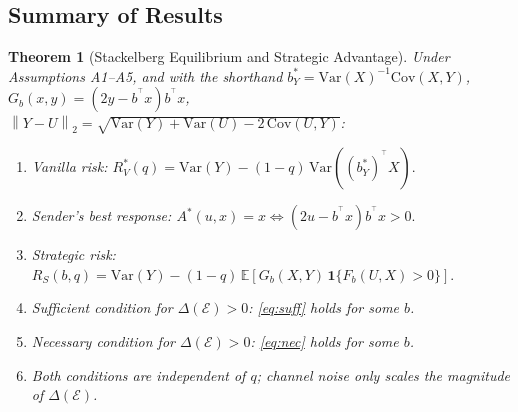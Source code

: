 \documentclass[11pt]{article}
\newtheorem{theorem}{Theorem}[section]
\theoremstyle{definition}
\theoremstyle{remark}
\newcommand{\E}{\mathbb{E}}
\newcommand{\norm}[1]{\left\lVert#1\right\rVert}
\newcommand{\T}{^{\top}}
\begin{document}
\subsection{Summary of Results}

\begin{theorem}[Stackelberg Equilibrium and Strategic Advantage]\label{thm:main}
  Under Assumptions A1--A5, and with the shorthand
  $b_{Y}^{*}=\mathrm{Var}(X)^{-1}\mathrm{Cov}(X,Y)$,
  $G_{b}(x,y)=(2y-b^{\T}x)b^{\T}x$, $\norm{Y-U}_{2}=\sqrt{\mathrm{Var}(Y)+\mathrm{Var}(U)-2\,\mathrm{Cov}(U,Y)}$:
  \begin{enumerate}[label=\normalfont(\roman*)]
    \item \emph{Vanilla risk:}
          $R_{V}^{*}(q) = \mathrm{Var}(Y) - (1-q)\,\mathrm{Var}((b_{Y}^{*})^{\T}X).$
    \item \emph{Sender's best response:}
          $A^{*}(u,x)=x \iff (2u-b^{\T}x)b^{\T}x>0.$
    \item \emph{Strategic risk:}
          $R_{S}(b,q) = \mathrm{Var}(Y)-(1-q)\,\E[G_{b}(X,Y)\,\mathbf{1}\{F_{b}(U,X)>0\}].$
    \item \emph{Sufficient condition} for $\Delta(\mathcal{E})>0$: \eqref{eq:suff} holds for
          some $b$.
    \item \emph{Necessary condition} for $\Delta(\mathcal{E})>0$: \eqref{eq:nec} holds for
          some $b$.
    \item Both conditions are \emph{independent of} $q$; channel noise only scales the
          magnitude of $\Delta(\mathcal{E})$.
  \end{enumerate}
\end{theorem}

\end{document}
